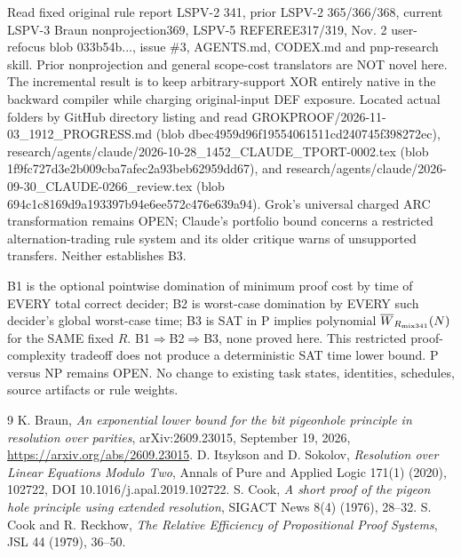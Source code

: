 \documentclass[11pt]{article}
\begin{document}
Read fixed original rule report LSPV-2 341, prior LSPV-2 365/366/368, current LSPV-3 Braun nonprojection369, LSPV-5 REFEREE317/319, Nov. 2 user-refocus blob 033b54b..., issue \#3, AGENTS.md, CODEX.md and pnp-research skill. Prior nonprojection and general scope-cost translators are NOT novel here. The incremental result is to keep arbitrary-support XOR entirely native in the backward compiler while charging original-input DEF exposure. Located actual folders by GitHub directory listing and read GROKPROOF/2026-11-03\_1912\_PROGRESS.md (blob dbec4959d96f19554061511cd240745f398272ec), research/agents/claude/2026-10-28\_1452\_CLAUDE\_TPORT-0002.tex (blob 1f9fc727d3e2b009cba7afec2a93beb62959dd67), and research/agents/claude/2026-09-30\_CLAUDE-0266\_review.tex (blob 694c1c8169d9a193397b94e6ee572c476e639a94). Grok's universal charged ARC transformation remains OPEN; Claude's portfolio bound concerns a restricted alternation-trading rule system and its older critique warns of unsupported transfers. Neither establishes B3.

B1 is the optional pointwise domination of minimum proof cost by time of EVERY total correct decider; B2 is worst-case domination by EVERY such decider's global worst-case time; B3 is SAT in P implies polynomial $\overline W_{R_{\rm mix341}}(N)$ for the SAME fixed $R$. B1$\Rightarrow$B2$\Rightarrow$B3, none proved here. This restricted proof-complexity tradeoff does not produce a deterministic SAT time lower bound. P versus NP remains OPEN. No change to existing task states, identities, schedules, source artifacts or rule weights.

\begin{thebibliography}{9}
 K. Braun, \emph{An exponential lower bound for the bit pigeonhole principle in resolution over parities}, arXiv:2609.23015, September 19, 2026, \url{https://arxiv.org/abs/2609.23015}.
 D. Itsykson and D. Sokolov, \emph{Resolution over Linear Equations Modulo Two}, Annals of Pure and Applied Logic 171(1) (2020), 102722, DOI 10.1016/j.apal.2019.102722.
 S. Cook, \emph{A short proof of the pigeon hole principle using extended resolution}, SIGACT News 8(4) (1976), 28--32.
 S. Cook and R. Reckhow, \emph{The Relative Efficiency of Propositional Proof Systems}, JSL 44 (1979), 36--50.
\end{thebibliography}
\end{document}

